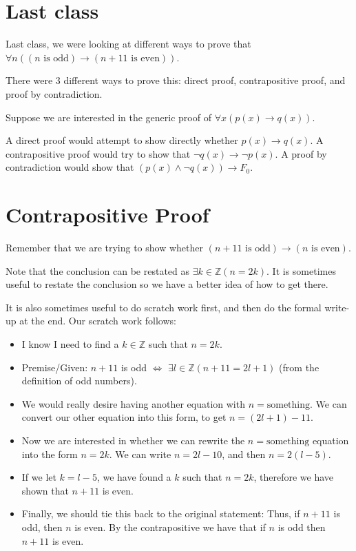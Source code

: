 \documentclass{article}
\begin{document}
\section*{Last class}

Last class, we were looking at different ways to prove that
$\forall{}n((\text{$n$ is odd})\rightarrow(\text{$n+11$ is even}))$.

There were 3 different ways to prove this: direct proof,
contrapositive proof, and proof by contradiction.

Suppose we are interested in the generic proof of
$\forall{}x(p(x)\rightarrow{}q(x))$.

A direct proof would attempt to show directly whether
$p(x)\rightarrow{}q(x)$. A contrapositive proof would try to show that
$\neg{}q(x)\rightarrow\neg{}p(x)$. A proof by contradiction would show
that $(p(x)\wedge\neg{}q(x))\rightarrow{}F_0$.

\section*{Contrapositive Proof}

Remember that we are trying to show whether
$(\text{$n+11$ is odd})\rightarrow(\text{$n$ is even})$.

Note that the conclusion can be restated as
$\exists{}k\in\mathbb{Z}(n=2k)$. It is sometimes useful to restate the
conclusion so we have a better idea of how to get there.

It is also sometimes useful to do scratch work first, and then do the
formal write-up at the end. Our scratch work follows:

\begin{itemize}
\item I know I need to find a $k\in\mathbb{Z}$ such that $n=2k$.
\item Premise/Given: $n+11$ is odd $\Leftrightarrow$
  $\exists{}l\in\mathbb{Z}(n+11=2l+1)$ (from the definition of odd
  numbers).
\item We would really desire having another equation with
  $n=\text{something}$. We can convert our other equation into this
  form, to get $n=(2l+1)-11$.
\item Now we are interested in whether we can rewrite the
  $n=\text{something}$ equation into the form $n=2k$. We can write
  $n=2l-10$, and then $n=2(l-5)$.
\item If we let $k=l-5$, we have found a $k$ such that $n=2k$,
  therefore we have shown that $n+11$ is even.
\item Finally, we should tie this back to the original statement:
  Thus, if $n+11$ is odd, then $n$ is even. By the contrapositive we
  have that if $n$ is odd then $n+11$ is even.
\end{itemize}
\end{document}
